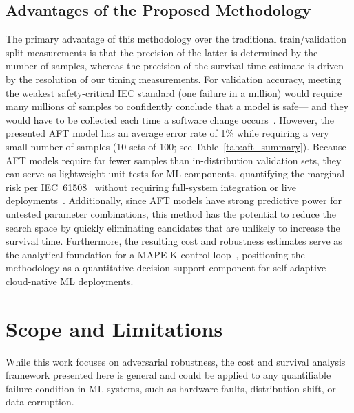 \documentclass[conference]{IEEEtran}%
\begin{document}
\subsection{Advantages of the Proposed Methodology}
\label{advantages}
The primary advantage of this methodology over the traditional train/validation split measurements is that the precision of the latter is determined by the number of samples, whereas the precision of the survival time estimate is driven by the resolution of our timing measurements.
For validation accuracy, meeting the weakest safety-critical IEC standard (one failure in a million) would require many millions of samples to confidently conclude that a model is safe--- and they would have to be collected each time a software change occurs~\cite{IEC61508}.
However, the presented AFT model has an average error rate of 1\% while requiring a very small number of samples (10 sets of 100; see Table~\ref{tab:aft_summary}).
Because AFT models require far fewer samples than in-distribution validation sets, they can serve as lightweight unit tests for ML components, quantifying the marginal risk per IEC~61508~\cite{IEC61508} without requiring full-system integration or live deployments~\cite{schmoor2000sample,lachin1981introduction}.
Additionally, since AFT models have strong predictive power for untested parameter combinations, this method has the potential to reduce the search space by quickly eliminating candidates that are unlikely to increase the survival time.
Furthermore, the resulting cost and robustness estimates serve as the analytical foundation for a MAPE-K control loop~\cite{kephart2003vision}, positioning the methodology as a quantitative decision-support component for self-adaptive cloud-native ML deployments.

\section{Scope and Limitations}
\label{considerations}

While this work focuses on adversarial robustness, the cost and survival analysis framework presented here is general and could be applied to any quantifiable failure condition in ML systems, such as hardware faults, distribution shift, or data corruption.
\end{document}
